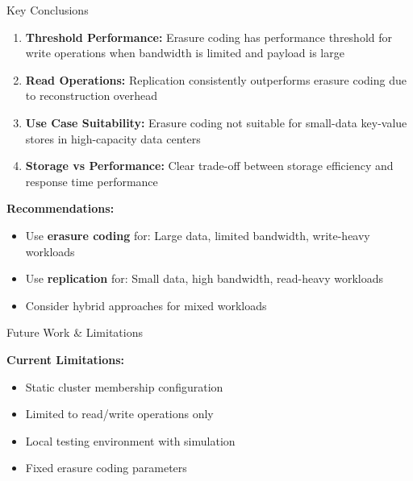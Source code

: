 \documentclass[a0,landscape]{config/poster/a0poster}
\newcommand{\postersection}[1]{%
  \begin{tcolorbox}[
      colback=ITBblue,
      colframe=ITBblue,
      fonttitle=\bfseries,
      coltext=white,
      sharp corners,
      boxrule=0pt,
      top=6pt,
      bottom=6pt,
      halign=center
    ]
    \Large #1
  \end{tcolorbox}%
}
\begin{document}
\begin{multicols}{4}

	\postersection{Key Conclusions}
	
	\begin{enumerate}
		\item \textbf{Threshold Performance:} Erasure coding has performance threshold for write operations when bandwidth is limited and payload is large
		
		\item \textbf{Read Operations:} Replication consistently outperforms erasure coding due to reconstruction overhead
		
		\item \textbf{Use Case Suitability:} Erasure coding not suitable for small-data key-value stores in high-capacity data centers
		
		\item \textbf{Storage vs Performance:} Clear trade-off between storage efficiency and response time performance
	\end{enumerate}

	\textbf{Recommendations:}
	\begin{itemize}
		\item Use \textcolor{ECcolor}{\textbf{erasure coding}} for: Large data, limited bandwidth, write-heavy workloads
		\item Use \textcolor{REPcolor}{\textbf{replication}} for: Small data, high bandwidth, read-heavy workloads
		\item Consider hybrid approaches for mixed workloads
	\end{itemize}


	\postersection{Future Work \& Limitations}
	
	\textbf{Current Limitations:}
	\begin{itemize}
		\item Static cluster membership configuration
		\item Limited to read/write operations only
		\item Local testing environment with simulation
		\item Fixed erasure coding parameters
	\end{itemize}


\end{multicols}
\end{document}
